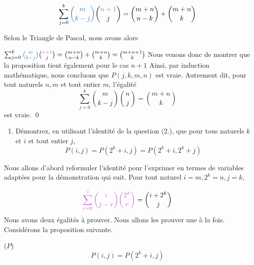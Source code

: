 \documentclass[16pt]{report}
\begin{document}
\begin{multicols*}{2}
\begin{Preuve*}{}{}
        \begin{align}
            \sum_{j=0}^{k} \textcolor{myb}{{m \choose k-j}} {\textcolor{myp}{n+1} \choose j} = {m + n \choose n - k} 
            + {m+n \choose k}
        \end{align}


        Selon le Triangle de Pascal, nous avons alors 

            $\sum_{j=0}^{k} \textcolor{myb}{{m \choose k-j}} {\textcolor{myp}{n+1} \choose j} = {m + n \choose n - k} 
            + {m+n \choose k} = {m+n+1 \choose k}$ Nous venons donc de montrer que la proposition tient 
            également pour le cas $n+1$ Ainsi, par induction mathématique, nous concluons que $P(j,k,m, n)$ est vraie. 
            Autrement dit, pour tout naturels $n, m$ et tout entier $m$, l'égalité 
                \[ \sum_{j=0}^{k} {m \choose k-j} {n \choose j} = {m+n \choose k} \]
            est vraie. \qed 
        \end{Preuve*}
        
        \columnbreak
        \begin{enumerate}
            \item Démontrez, en utilisant l’identité de la question (2.), que pour tous naturels $k$ et $i$ 
                et tout entier $j$, 
                \[ P(i, j) = P(2^k +i, j) = P(2^k +i, 2^k +j) \]
        \end{enumerate}
        Nous allons d'abord reformuler l'identité pour l'exprimer en termes de variables 
        adaptées pour la démonstration qui suit. Pour tout naturel $i = m, 2^k = n, j = k$, 
        
        \begin{align}
            \textcolor{myp}{\sum_{r=0}^{j} {i \choose j-r} {2^k \choose r}} = {i + 2^k   \choose j}
        \end{align}
        Nous avons deux égalités à prouver. Nous allons les prouver une à la fois. 
        Considérons la proposition suivante.  

    \begin{prop}{($P$)}{}
        \[ P(i, j) = P(2^k +i, j) \]
    \end{prop}
    

\end{multicols*}
\end{document}

